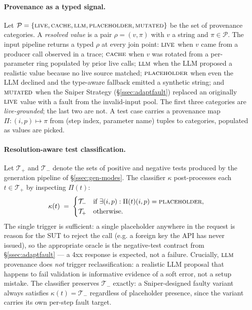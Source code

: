 \documentclass[conference]{IEEEtran}
\begin{document}
\paragraph{Provenance as a typed signal.}
Let $\mathcal{P} = \{\textsc{live}, \textsc{cache}, \textsc{llm}, \textsc{placeholder}, \textsc{mutated}\}$ be the set of provenance categories. A \emph{resolved value} is a pair $\rho = (v, \pi)$ with $v$ a string and $\pi \in \mathcal{P}$. The input pipeline returns a typed $\rho$ at every join point: $\textsc{live}$ when $v$ came from a producer call observed in a trace; $\textsc{cache}$ when $v$ was rotated from a per-parameter ring populated by prior live calls; $\textsc{llm}$ when the LLM proposed a realistic value because no live source matched; $\textsc{placeholder}$ when even the LLM declined and the type-aware fallback emitted a synthetic string; and $\textsc{mutated}$ when the Sniper Strategy (\S\ref{ssec:adaptfault}) replaced an originally $\textsc{live}$ value with a fault from the invalid-input pool. The first three categories are \emph{live-grounded}; the last two are not. A test case carries a provenance map $\Pi: (i, p) \mapsto \pi$ from (step index, parameter name) tuples to categories, populated as values are picked.

\paragraph{Resolution-aware test classification.}
Let $\mathcal{T}_+$ and $\mathcal{T}_-$ denote the sets of positive and negative tests produced by the generation pipeline of \S\ref{ssec:gen-modes}. The classifier $\kappa$ post-processes each $t \in \mathcal{T}_+$ by inspecting $\Pi(t)$:
\[
\kappa(t) \;=\; \begin{cases} \mathcal{T}_- & \text{if } \exists (i, p): \Pi(t)(i, p) = \textsc{placeholder}, \\ \mathcal{T}_+ & \text{otherwise.} \end{cases}
\]
The single trigger is sufficient: a single placeholder anywhere in the request is reason for the SUT to reject the call (e.g. a foreign key the API has never issued), so the appropriate oracle is the negative-test contract from \S\ref{ssec:adaptfault} --- a 4xx response is expected, not a failure. Crucially, $\textsc{llm}$ provenance does \emph{not} trigger reclassification: a realistic LLM proposal that happens to fail validation is informative evidence of a soft error, not a setup mistake. The classifier preserves $\mathcal{T}_-$ exactly: a Sniper-designed faulty variant always satisfies $\kappa(t) = \mathcal{T}_-$ regardless of placeholder presence, since the variant carries its own per-step fault target.
\end{document}
